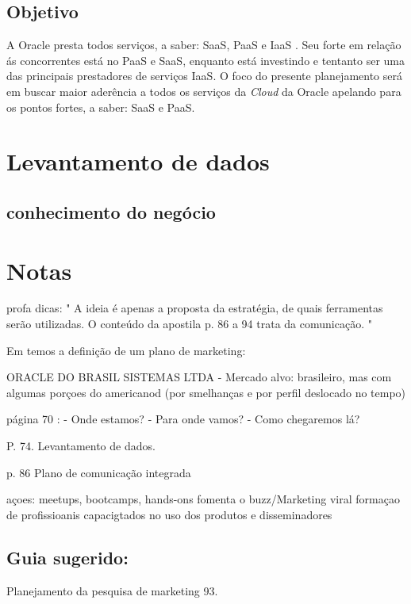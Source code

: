 \documentclass[a4paper]{article}
\newcommand{\C}{\emph{Cloud }}
\begin{document}
\subsection{Objetivo}
A Oracle presta todos serviços, a saber: SaaS, PaaS e IaaS \cite{OqueeOra85:online}. Seu forte em relação ás concorrentes está no PaaS e SaaS, enquanto está investindo e tentanto ser uma das principais prestadores de serviços IaaS. O foco do presente planejamento será em buscar maior aderência a todos os serviços da \C da Oracle apelando para os pontos fortes, a saber: SaaS e PaaS.

\section{Levantamento de dados}

\subsection{conhecimento do negócio}


\section{Notas}
profa dicas:
"
A ideia é apenas a proposta da estratégia, de quais ferramentas serão utilizadas.
O conteúdo da apostila p. 86 a 94 trata da comunicação.
"



Em  temos a definição de um plano de marketing:

ORACLE DO BRASIL SISTEMAS LTDA \cite{OracleBr51:online}
- Mercado alvo: brasileiro, mas com algumas porçoes do americanod (por smelhanças e por perfil deslocado no tempo)

página 70 \cite{MarketingTeixeira}:
- Onde estamos?
- Para onde vamos?
- Como chegaremos lá?

P. 74.
Levantamento de dados.

p. 86
Plano de comunicação integrada

açoes:
meetups, bootcamps, hands-ons
fomenta o buzz/Marketing viral
formaçao de profissioanis capacigtados no uso dos produtos e disseminadores

\subsection{Guia sugerido:}

Planejamento da pesquisa de marketing 93.
\end{document}
